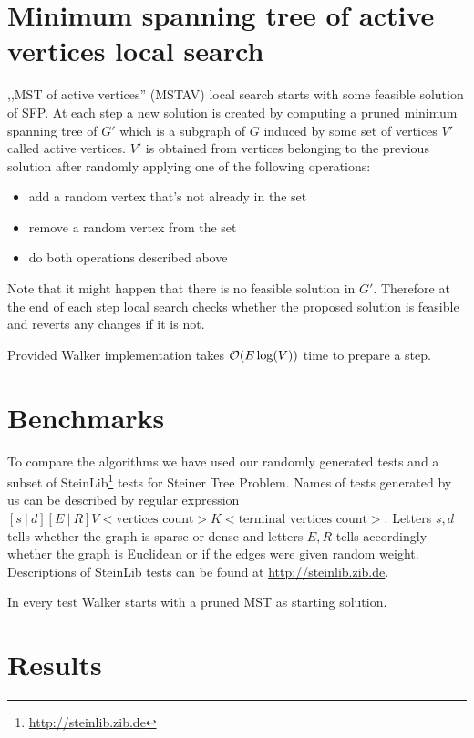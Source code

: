 \section{Minimum spanning tree of active vertices local search}
,,MST of active vertices'' (MSTAV) local search starts with some feasible solution of SFP. At each step a new solution is created by computing a pruned minimum spanning tree of $G'$ which is a subgraph of $G$ induced by some set of vertices $V'$ called active vertices. $V'$ is obtained from vertices belonging to the previous solution after randomly applying one of the following operations:
\begin{itemize}
\item add a random vertex that's not already in the set
\item remove a random vertex from the set
\item do both operations described above
\end{itemize}

Note that it might happen that there is no feasible solution in $G'$. Therefore at the end of each step local search checks whether the proposed solution is feasible and reverts any changes if it is not.

Provided Walker implementation takes $\mathcal{O}(E \log(V))$ time to prepare a step.

\section{Benchmarks}
To compare the algorithms we have used our randomly generated tests and a subset of SteinLib\footnote{\url{http://steinlib.zib.de}} tests for Steiner Tree Problem.
Names of tests generated by us can be described by regular expression $[s\ |\ d][E\ |\ R]V<\text{vertices count}>K<\text{terminal vertices count}>$. Letters $s, d$ tells whether the graph is sparse or dense and letters $E, R$ tells accordingly whether the graph is Euclidean or if the edges were given random weight. Descriptions of SteinLib tests can be found at \url{http://steinlib.zib.de}.

In every test Walker starts with a pruned MST as starting solution.
\section{Results}

